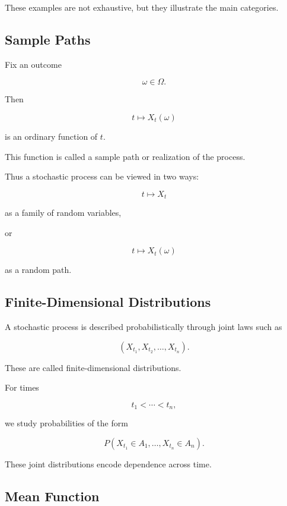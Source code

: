 These examples are not exhaustive, but they illustrate the main
categories.

\subsection{Sample Paths}
\label{subsec:sample-paths}

Fix an outcome

\[
\omega\in\Omega.
\]

Then

\[
t\mapsto X_t(\omega)
\]

is an ordinary function of \(t\).

This function is called a sample path or realization of the process.

Thus a stochastic process can be viewed in two ways:

\[
\boxed{
t\mapsto X_t
}
\]

as a family of random variables,

or

\[
\boxed{
t\mapsto X_t(\omega)
}
\]

as a random path.

\subsection{Finite-Dimensional Distributions}
\label{subsec:finite-dimensional-distributions}

A stochastic process is described probabilistically through joint laws
such as

\[
(X_{t_1},X_{t_2},\ldots,X_{t_n}).
\]

These are called finite-dimensional distributions.

For times

\[
t_1<\cdots<t_n,
\]

we study probabilities of the form

\[
\boxed{
P
(
X_{t_1}\in A_1,
\ldots,
X_{t_n}\in A_n
).
}
\]

These joint distributions encode dependence across time.

\subsection{Mean Function}
\label{subsec:process-mean-function}

